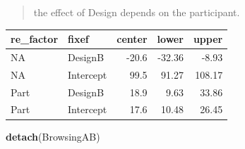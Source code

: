 \documentclass[]{svmono}
\newenvironment{Shaded}{\begin{snugshade}}{\end{snugshade}}
\newcommand{\KeywordTok}[1]{\textcolor[rgb]{0.13,0.29,0.53}{\textbf{#1}}}
\newcommand{\DataTypeTok}[1]{\textcolor[rgb]{0.13,0.29,0.53}{#1}}
\newcommand{\DecValTok}[1]{\textcolor[rgb]{0.00,0.00,0.81}{#1}}
\newcommand{\StringTok}[1]{\textcolor[rgb]{0.31,0.60,0.02}{#1}}
\newcommand{\OperatorTok}[1]{\textcolor[rgb]{0.81,0.36,0.00}{\textbf{#1}}}
\newcommand{\NormalTok}[1]{#1}
\begin{document}
\begin{quote}
the effect of Design depends on the participant.
\end{quote}

\begin{Shaded}
\end{Shaded}

\begin{tabular}{l|l|r|r|r}
\hline
re\_factor & fixef & center & lower & upper\\
\hline
NA & DesignB & -20.6 & -32.36 & -8.93\\
\hline
NA & Intercept & 99.5 & 91.27 & 108.17\\
\hline
Part & DesignB & 18.9 & 9.63 & 33.86\\
\hline
Part & Intercept & 17.6 & 10.48 & 26.45\\
\hline
\end{tabular}

\begin{Shaded}
\begin{Highlighting}[]
\KeywordTok{detach}\NormalTok{(BrowsingAB)}
\end{Highlighting}
\end{Shaded}
\end{document}
